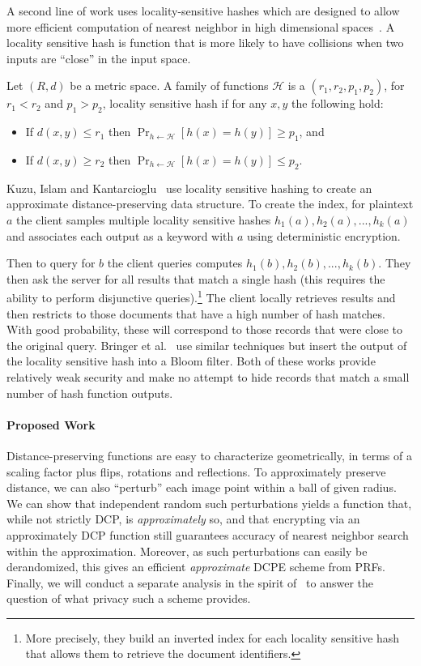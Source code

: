 A second line of work uses locality-sensitive hashes which are designed to allow more efficient computation of nearest neighbor in high dimensional spaces~\cite{datar2004locality,slaney2008locality}.  A locality sensitive hash is function that is more likely to have collisions when two inputs are ``close'' in the input space.  \begin{definition}
Let $(R,d)$ be a metric space.  A family of functions $\mathcal{H}$ is a $(r_1, r_2, p_1, p_2)$, for $r_1< r_2$ and $p_1 >p_2$, locality sensitive hash if for any $x, y$ the following hold:
\begin{itemize}\setlength\itemsep{0em}
\item If $d(x, y) \le r_1$ then $\Pr_{h\leftarrow \mathcal{H}}[h(x) = h(y)] \ge p_1$, and 
\item If $d(x, y) \ge r_2$ then $\Pr_{h\leftarrow \mathcal{H}}[h(x) = h(y)] \le p_2$.
\end{itemize}
\end{definition}
 
Kuzu, Islam and Kantarcioglu~\cite{kuzu2012efficient} use locality sensitive hashing to create an approximate distance-preserving data structure.  To create the index, for plaintext $a$ the client samples multiple locality sensitive hashes $h_1(a), h_2(a),...,h_k(a)$ and associates each output as a keyword with $a$ using deterministic encryption.

Then to query for $b$ the client queries computes $h_1(b), h_2(b),...,h_k(b)$. They then ask the server for all results that match a single hash (this requires the ability to perform disjunctive queries).\footnote{More precisely, they build an inverted index for each locality sensitive hash that allows them to retrieve the document identifiers.}  The client locally retrieves results and then restricts to those documents that have a high number of hash matches.  With good probability, these will correspond to those records that were close to the original query.  Bringer et al.~\cite{bringer2011identification,bringer2009error} use similar techniques but insert the output of the locality sensitive hash into a Bloom filter.  Both of these works provide relatively weak security and make no attempt to hide records that match a small number of hash function outputs.  

\paragraph{Proposed Work}
Distance-preserving functions are easy to characterize geometrically, in terms of a scaling factor plus flips, rotations and reflections.  To approximately preserve distance, we can also  ``perturb'' each image point within a ball of given radius.  
We can show that independent random such perturbations yields a function that, while not strictly DCP, is \emph{approximately} so, and that encrypting via an approximately DCP function still guarantees accuracy of nearest neighbor  search within the approximation.  Moreover, as such perturbations can easily be derandomized, this gives an efficient \emph{approximate} DCPE scheme from PRFs.  Finally, we will conduct a separate analysis in the spirit of~\cite{C:BolCheONe11} to answer the question of what privacy such a scheme provides.  

